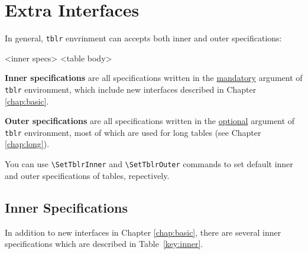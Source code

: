 \documentclass[oneside]{book}
\begin{document}
\chapter{Extra Interfaces}
\label{chap:extra}

In general, \verb!tblr! envrinment can accepts both inner and outer specifications:

\begin{codehigh}
\begin{tblr}{<inner specs>}
  <table body>
\end{tblr}
\end{codehigh}

\textbf{Inner specifications} are all specifications written in the \underline{mandatory} argument
of \verb!tblr! environment, which include new interfaces described in Chapter \ref{chap:basic}.

\textbf{Outer specifications} are all specifications written in the \underline{optional} argument
of \verb!tblr! environment, most of which are used for long tables (see Chapter \ref{chap:long}).

You can use \verb!\SetTblrInner! and \verb!\SetTblrOuter! commands
to set default inner and outer specifications of tables, repectively.

\section{Inner Specifications}

In addition to new interfaces in Chapter \ref{chap:basic},
there are several inner specifications which are described in Table~\ref{key:inner}.
\end{document}
